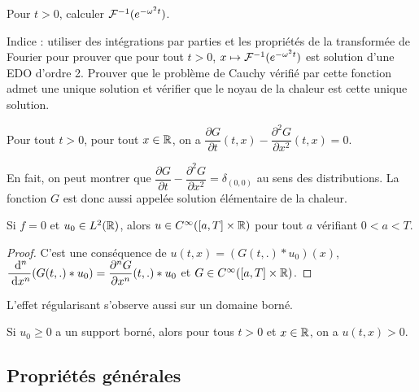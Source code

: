 \documentclass[12pt,a4paper,twoside]{article}
\begin{document}
\begin{exercise}
  Pour $t > 0$, calculer $\mathcal{F}^{-1}(e^{-\omega^2 t})$.

  Indice : utiliser des int\'egrations par parties et les propri\'et\'es de la transform\'ee
  de Fourier pour prouver que pour tout $t > 0$, $x \mapsto \mathcal{F}^{-1}(e^{-\omega^2 t})$ est solution
  d'une EDO d'ordre 2.
  Prouver que le probl\`eme de Cauchy v\'erifi\'e par cette fonction admet une unique solution
  et v\'erifier que le noyau de la chaleur est cette unique solution.
\end{exercise}


\begin{proposition}
  Pour tout $t > 0$, pour tout $x \in \mathbb{R}$, on a
  $\dfrac{\partial G}{\partial t}(t,x) - \dfrac{\partial^2 G}{\partial x^2}(t,x) = 0$.
\end{proposition}

\begin{remark}
  En fait, on peut montrer que
  $\dfrac{\partial G}{\partial t} - \dfrac{\partial^2 G}{\partial x^2} = \delta_{(0,0)}$
  au sens des distributions.
  La fonction $G$ est donc aussi appel\'ee solution \'el\'ementaire de la chaleur.
\end{remark}

\begin{proposition}
  Si $f=0$ et $u_0 \in L^2(\mathbb{R})$, alors $u \in C^{\infty}([a,T] \times \mathbb{R})$ pour tout $a$ v\'erifiant
  $0 < a < T$.
\end{proposition}

\begin{proof}
  C'est une cons\'equence de $u(t,x) = (G(t,.) * u_0)(x)$,
  $\dfrac{\;\mathrm{d}^n}{\;\mathrm{d} x^n}(G(t,.) * u_0) = \dfrac{\partial^n G}{\partial x^n}(t,.) * u_0$
  et $G \in C^{\infty}([a,T] \times \mathbb{R})$.
\end{proof}

\begin{remark}
  L'effet r\'egularisant s'observe aussi sur un domaine born\'e.
\end{remark}

\begin{proposition}
  Si $u_0 \geq 0$ a un support born\'e, alors pour tous $t > 0$ et $x \in \mathbb{R}$,
  on a $u(t,x) > 0$.
\end{proposition}

\subsection{Propri\'et\'es g\'en\'erales}
\label{subsec:chaleur_prop}
\end{document}
